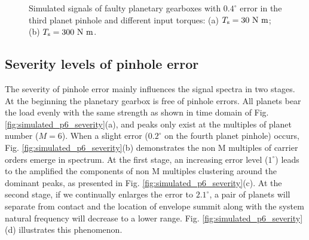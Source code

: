 \documentclass[a4paper,fleqn]{cas-sc}%
\begin{document}
\begin{figure}[pos=htbp]
    \caption{Simulated signals of faulty planetary gearboxes with $0.4^\circ$ error in the third planet pinhole and different input torques: (a) $T_{\rm s}=30\ {\rm N\ m}$; (b) $T_{\rm s}=300\ {\rm N\ m}$.}
    \label{fig:simulated_p5_fault}
\end{figure}
\subsection{Severity levels of pinhole error}
\par The severity of pinhole error mainly influences the signal spectra in two stages. At the beginning the planetary gearbox is free of pinhole errors. All planets bear the load evenly with the same strength as shown in time domain of Fig. \ref{fig:simulated_p6_severity}(a), and peaks only exist at the multiples of planet number ($M=6$). When a slight error ($0.2^\circ$ on the fourth planet pinhole) occurs, Fig. \ref{fig:simulated_p6_severity}(b) demonstrates the non M multiples of carrier orders emerge in spectrum.  At the first stage, an increasing error level ($1^\circ$) leads to the amplified the components of non M multiples clustering around the dominant peaks, as presented in Fig. \ref{fig:simulated_p6_severity}(c). At the second stage, if we continually enlarges the error to $2.1^\circ$, a pair of planets will separate from contact and the location of envelope summit along with the system natural frequency will decrease to a lower range. Fig. \ref{fig:simulated_p6_severity}(d) illustrates this phenomenon.
\end{document}
